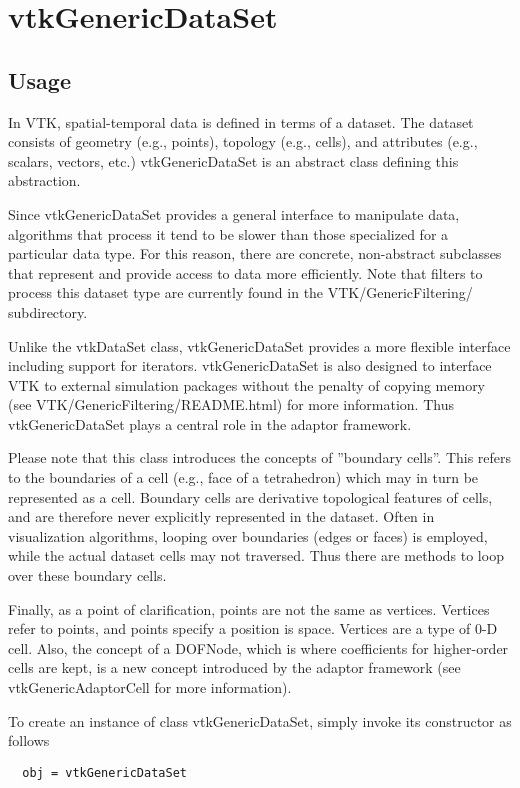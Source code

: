 \section{vtkGenericDataSet}

\subsection{Usage}

 In VTK, spatial-temporal data is defined in terms of a dataset. The
 dataset consists of geometry (e.g., points), topology (e.g., cells), and
 attributes (e.g., scalars, vectors, etc.) vtkGenericDataSet is an abstract
 class defining this abstraction.

 Since vtkGenericDataSet provides a general interface to manipulate data,
 algorithms that process it tend to be slower than those specialized for a
 particular data type. For this reason, there are concrete, non-abstract
 subclasses that represent and provide access to data more efficiently.
 Note that filters to process this dataset type are currently found in the
 VTK/GenericFiltering/ subdirectory.

 Unlike the vtkDataSet class, vtkGenericDataSet provides a more flexible
 interface including support for iterators. vtkGenericDataSet is also
 designed to interface VTK to external simulation packages without the
 penalty of copying memory (see VTK/GenericFiltering/README.html) for
 more information. Thus vtkGenericDataSet plays a central role in the
 adaptor framework.

 Please note that this class introduces the concepts of ''boundary cells''.
 This refers to the boundaries of a cell (e.g., face of a tetrahedron)
 which may in turn be represented as a cell. Boundary cells are derivative
 topological features of cells, and are therefore never explicitly
 represented in the dataset. Often in visualization algorithms, looping
 over boundaries (edges or faces) is employed, while the actual dataset
 cells may not traversed. Thus there are methods to loop over these
 boundary cells.

 Finally, as a point of clarification, points are not the same as vertices.
 Vertices refer to points, and points specify a position is space. Vertices
 are a type of 0-D cell. Also, the concept of a DOFNode, which is where
 coefficients for higher-order cells are kept, is a new concept introduced
 by the adaptor framework (see vtkGenericAdaptorCell for more information).


To create an instance of class vtkGenericDataSet, simply
invoke its constructor as follows
\begin{verbatim}
  obj = vtkGenericDataSet
\end{verbatim}

